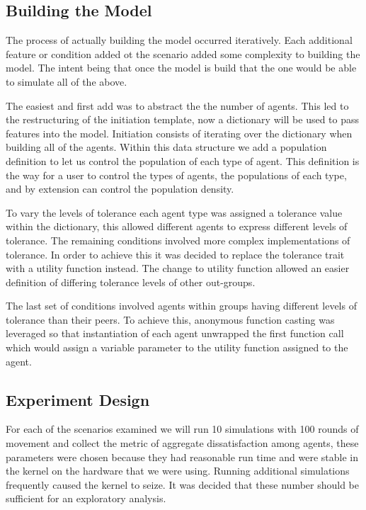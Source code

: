 \documentclass[sigplan,nonacm]{acmart}
\begin{document}
\subsection{Building the Model}

The process of actually building the model occurred iteratively.
Each additional feature or condition added ot the scenario added some complexity to building the model.
The intent being that once the model is build that the one would be able to simulate all of the above.

The easiest and first add was to abstract the the number of agents.
This led to the restructuring of the initiation template, now a dictionary will be used to pass
features into the model.
Initiation consists of iterating over the dictionary when building all of the agents.
Within this data structure we add a population definition to let us control the population of each type of agent.
This definition is the way for a user to control the types of agents, the populations of each type, 
and by extension can control the population density.

To vary the levels of tolerance each agent type was assigned a tolerance value within the dictionary,
this allowed different agents to express different levels of tolerance.
The remaining conditions involved more complex implementations of tolerance.
In order to achieve this it was decided to replace the tolerance trait with a utility function instead.
The change to utility function allowed an easier definition of differing tolerance levels of other out-groups.

The last set of conditions involved agents within groups having different levels of tolerance than their peers.
To achieve this, anonymous function casting was leveraged so that instantiation of each agent
unwrapped the first function call which would assign a variable parameter to the utility function assigned to the agent.

\subsection{Experiment Design}

For each of the scenarios examined we will run 10 simulations with 100 rounds of movement and collect the metric
of aggregate dissatisfaction among agents, these parameters were chosen because they had reasonable run time
and were stable in the kernel on the hardware that we were using. 
Running additional simulations frequently caused the kernel to seize.
It was decided that these number should be sufficient for an exploratory analysis.
\end{document}
